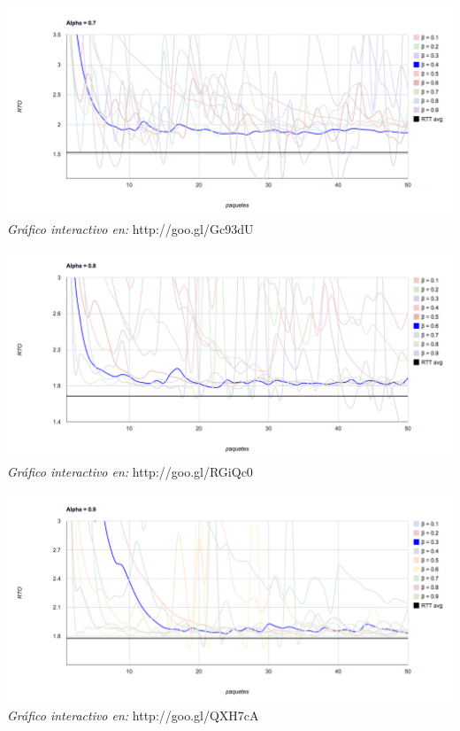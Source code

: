 \begin{center}
	\includegraphics[scale=0.35]{graphics/rto_vs_paquetes_a_7.png}
	\textit{Gráfico interactivo en:} http://goo.gl/Gc93dU
\end{center}

\begin{center}
	\includegraphics[scale=0.35]{graphics/rto_vs_paquetes_a_8.png}
	\textit{Gráfico interactivo en:} http://goo.gl/RGiQc0
\end{center}

\begin{center}
	\includegraphics[scale=0.35]{graphics/rto_vs_paquetes_a_9.png}
	\textit{Gráfico interactivo en:} http://goo.gl/QXH7cA
\end{center}

